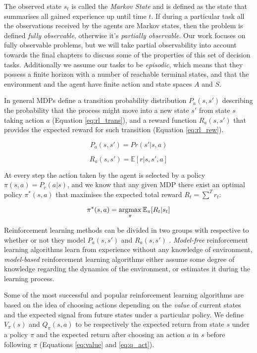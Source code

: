 The observed state $s_t$ is called the \emph{Markov State} and is defined as the
state that summarises all gained experience up until time $t$. If during a
particular task all the observations received by the agents are Markov states,
then the problem is defined \emph{fully observable}, otherwise it's
\emph{partially observable}. Our work focuses on fully observable problems, but
we will take partial observability into account towards the final chapters to
discuss some of the properties of this set of decision tasks. Additionally we
assume our tasks to be \emph{episodic}, which means that they possess a finite
horizon with a number of reachable terminal states, and that the environment and
the agent have finite action and state spaces $A$ and $S$.

In general MDPs define a transition probability distribution $P_a(s, s')$
describing the probability that the process might move into a new state $s'$
from state $s$ taking action $a$ (Equation \ref{eq:rl_trans}), and a reward
function $R_a(s, s')$ that provides the expected reward for such transition
(Equation \ref{eq:rl_rew}).

\begin{equation}
P_a(s, s') = Pr(s' | s, a)
\label{eq:rl_trans}
\end{equation}

\begin{equation}
R_a(s, s') = \mathbb{E}[r|s, s', a]
\label{eq:rl_rew}
\end{equation}

At every step the action taken by the agent is selected by a policy $\pi(s, a) =
P_r(a | s)$, and we know that any given MDP there exist an optimal policy
$\pi^*(s, a)$ that maximises the expected total reward $R_t = \sum^T{r_t}$:

\begin{equation}
  \pi^*(s, a) = \operatornamewithlimits{argmax}_{\pi} \mathbb{E}_{\pi}[R_t | s_t]
\end{equation}

Reinforcement learning methods can be divided in two groups with respective to
whether or not they model $P_a(s, s')$ and $R_a(s, s')$
\citep{atkeson1997comparison}. \emph{Model-free} reinforcement learning
algorithms learn from experience without any knowledge of environment,
\emph{model-based} reinforcement learning algorithms either assume some degree
of knowledge regarding the dynamics of the environment, or estimates it during
the learning process.

Some of the most successful and popular reinforcement learning algorithms are
based on the idea of choosing actions depending on the \emph{value} of current
states and the expected signal from future states under a particular policy. We
define $V_{\pi}(s)$ and $Q_{\pi}(s, a)$ to be respectively the expected return
from state $s$ under a policy $\pi$ and the expected return after choosing an
action $a$ in $s$ before following $\pi$ (Equations \ref{eq:value} and
\ref{eq:q_act}).

